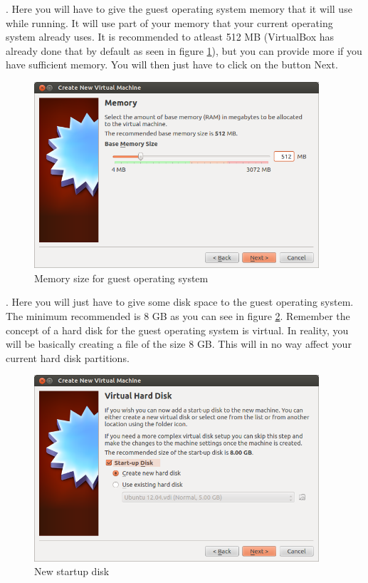 \par {}. Here you will have to give the guest operating system memory that it will use while running. It will use part of your memory that your current operating system already uses. It is recommended to atleast 512 MB (VirtualBox has already done that by default as seen in figure \ref{fig:wizard-memory}), but you can provide more if you have sufficient memory.  You will then just have to click on the button Next. \\

\begin{figure}[!h]	
	\centering
	\includegraphics[width=300pt]{./images/installation/virtualbox/wizard-memory.png}
	\caption{Memory size for guest operating system}	
	\label{fig:wizard-memory}	
\end{figure}

\par {}. Here you will just have to give some disk space to the guest operating system. The minimum recommended is 8 GB as you can see in figure \ref{fig:wizard-newharddisk}.  Remember the concept of a hard disk for the guest operating system is virtual. In reality, you will be basically creating a file of the size 8 GB. This will in no way affect your current hard disk partitions. \\ 

\begin{figure}[!h]	
	\centering
	\includegraphics[width=300pt]{./images/installation/virtualbox/wizard-newharddisk.png}
	\caption{New startup disk}	
	\label{fig:wizard-newharddisk}	
\end{figure}

